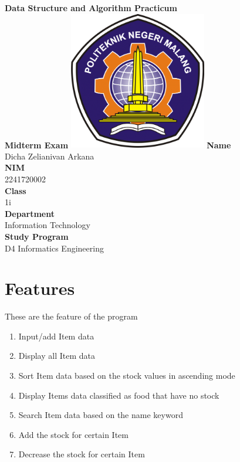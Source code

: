 \documentclass[12pt,titlepage]{article}
\newcommand{\vSubject}{Data Structure and Algorithm Practicum}
\newcommand{\vSubtitle}{Midterm Exam}
\newcommand{\vName}{Dicha Zelianivan Arkana}
\newcommand{\vNIM}{2241720002}
\newcommand{\vClass}{1i}
\newcommand{\vDepartment}{Information Technology}
\newcommand{\vStudyProgram}{D4 Informatics Engineering}
\begin{document}
\begin{titlepage}
    \centering
    \vfill
    {\bfseries\LARGE
        \vSubject\\
        \vskip0.25cm
        \vSubtitle
    }
    \vfill
    \includegraphics[width=6cm]{images/polinema-logo.png}
    \vfill
    {
        \textbf{Name}\\
        \vName\\
        \vskip0.5cm
        \textbf{NIM}\\
        \vNIM\\
        \vskip0.5cm
        \textbf{Class}\\
        \vClass\\
        \vskip0.5cm
        \textbf{Department}\\
        \vDepartment\\
        \vskip0.5cm
        \textbf{Study Program}\\
        \vStudyProgram
    }
\end{titlepage}

\section{Features}
These are the feature of the program
\begin{enumerate}
    \item Input/add Item data
    \item Display all Item data
    \item Sort Item data based on the stock values in ascending mode
    \item Display Items data classified as food that have no stock
    \item Search Item data based on the name keyword
    \item Add the stock for certain Item
    \item Decrease the stock for certain Item
\end{enumerate}
\end{document}
